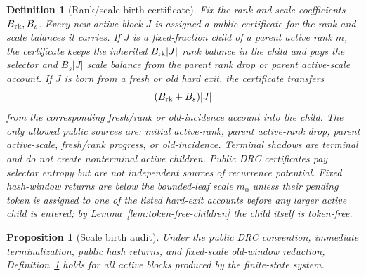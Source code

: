\documentclass[11pt]{article}
\newtheorem{proposition}[theorem]{Proposition}
\newtheorem{definition}[theorem]{Definition}
\begin{document}
\begin{definition}[Rank/scale birth certificate]
\label{hyp:birth}
Fix the rank and scale coefficients $B_{\rm rk},B_s$.  Every new active block
$J$ is assigned a public certificate for the rank and scale balances it carries.
If $J$ is a fixed-fraction child of a parent active rank $m$, the certificate
keeps the inherited $B_{\rm rk}|J|$ rank balance in the child and pays the
selector and $B_s|J|$ scale balance from the parent rank drop or parent
active-scale account.  If $J$ is born from a fresh or old hard exit, the
certificate transfers
\[
  (B_{\rm rk}+B_s)|J|
\]
from the corresponding fresh/rank or old-incidence account into the child.
The only allowed public sources are: initial active-rank, parent active-rank
drop, parent active-scale, fresh/rank progress, or old-incidence.
Terminal shadows are terminal and do not create
nonterminal active children.  Public DRC certificates pay selector entropy but
are not independent sources of recurrence potential.  Fixed hash-window
returns are below the bounded-leaf scale $m_0$ unless their pending token is
assigned to one of the listed hard-exit accounts before any larger active child
is entered; by Lemma~\ref{lem:token-free-children} the child itself is
token-free.
\end{definition}

\begin{proposition}[Scale birth audit]
\label{prop:birth}
Under the public DRC convention, immediate terminalization, public hash
returns, and fixed-scale old-window reduction, Definition~\ref{hyp:birth}
holds for all active blocks produced by the finite-state system.
\end{proposition}
\end{document}
